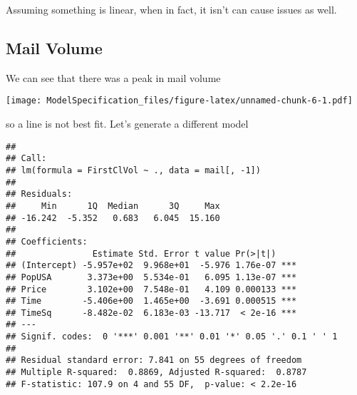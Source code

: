 \documentclass[
]{article}
\newenvironment{Shaded}{\begin{snugshade}}{\end{snugshade}}
\newcommand{\AttributeTok}[1]{\textcolor[rgb]{0.13,0.29,0.53}{#1}}
\newcommand{\DecValTok}[1]{\textcolor[rgb]{0.00,0.00,0.81}{#1}}
\newcommand{\FunctionTok}[1]{\textcolor[rgb]{0.13,0.29,0.53}{\textbf{#1}}}
\newcommand{\NormalTok}[1]{#1}
\newcommand{\OtherTok}[1]{\textcolor[rgb]{0.56,0.35,0.01}{#1}}
\newcommand{\SpecialCharTok}[1]{\textcolor[rgb]{0.81,0.36,0.00}{\textbf{#1}}}
\newcommand{\StringTok}[1]{\textcolor[rgb]{0.31,0.60,0.02}{#1}}
\begin{document}
Assuming something is linear, when in fact, it isn't can cause issues as
well.

\subsection{Mail Volume}\label{mail-volume}

We can see that there was a peak in mail volume

\begin{Shaded}
\end{Shaded}

\texttt{[image: ModelSpecification\_files/figure-latex/unnamed-chunk-6-1.pdf]}

so a line is not best fit. Let's generate a different model

\begin{Shaded}
\end{Shaded}

\begin{verbatim}
## 
## Call:
## lm(formula = FirstClVol ~ ., data = mail[, -1])
## 
## Residuals:
##     Min      1Q  Median      3Q     Max 
## -16.242  -5.352   0.683   6.045  15.160 
## 
## Coefficients:
##               Estimate Std. Error t value Pr(>|t|)    
## (Intercept) -5.957e+02  9.968e+01  -5.976 1.76e-07 ***
## PopUSA       3.373e+00  5.534e-01   6.095 1.13e-07 ***
## Price        3.102e+00  7.548e-01   4.109 0.000133 ***
## Time        -5.406e+00  1.465e+00  -3.691 0.000515 ***
## TimeSq      -8.482e-02  6.183e-03 -13.717  < 2e-16 ***
## ---
## Signif. codes:  0 '***' 0.001 '**' 0.01 '*' 0.05 '.' 0.1 ' ' 1
## 
## Residual standard error: 7.841 on 55 degrees of freedom
## Multiple R-squared:  0.8869, Adjusted R-squared:  0.8787 
## F-statistic: 107.9 on 4 and 55 DF,  p-value: < 2.2e-16
\end{verbatim}
\end{document}
